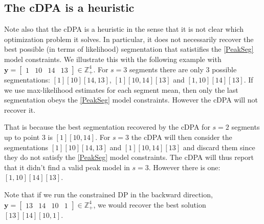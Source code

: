 \documentclass{article}
\newcommand{\ZZ}{\mathbb Z}
\begin{document}
\subsection{The cDPA is a heuristic}
\label{sec:dp-fails}

Note also that the cDPA is a heuristic in the sense that it is not
clear which optimization problem it solves.  In particular, it does
not necessarily recover the best possible (in terms of likelihood)
segmentation that satistifies the \ref{PeakSeg} model constraints.  We
illustrate this with the following example with
$\mathbf y = \left[\begin{array}{cccc} 1 & 10 & 14 & 13
\end{array}\right]\in\ZZ_+^4
$. For $s=3$ segments there are only 3 possible segmentations:
$[1][10][14, 13]$, $[1][10, 14][13]$ and $[1, 10][14][13]$. If we use
max-likelihood estimates for each segment mean, then only the last
segmentation obeys the \ref{PeakSeg} model constraints. However the
cDPA will not recover it.

That is because the best segmentation recovered by the cDPA for $s=2$
segments up to point $3$ is $[1][10, 14]$.
For $s=3$ the cDPA will then consider the segmentations $[1][10][14,
13]$ and $[1][10, 14][13]$ and discard them since they do not satisfy
the \ref{PeakSeg} model constraints. The cDPA will thus report that it
didn't find a valid peak model in $s=3$. However there is one: $[1,
10][14][13]$.

Note that if we run the constrained DP in the backward direction, 
$\mathbf y = \left[\begin{array}{cccc} 13 & 14 & 10 & 1
\end{array}\right]\in\ZZ_+^4
$, we would recover the best solution $[13][14][10, 1]$.




\end{document}

